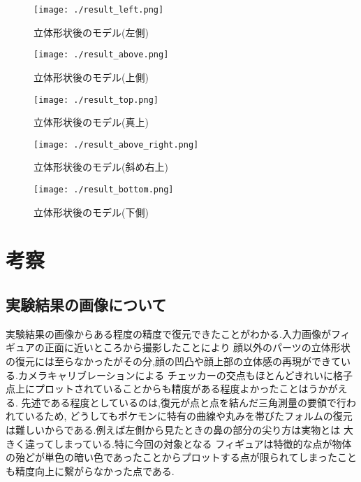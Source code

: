 \documentclass[11pt,a4j]{jsarticle}
\begin{document}
    \begin{figure}[H]
      \centering
      \texttt{[image: ./result\_left.png]}
      \caption{立体形状後のモデル(左側)\label{fig:result_left}}
    \end{figure}
    \begin{figure}[H]
      \centering
      \texttt{[image: ./result\_above.png]}
      \caption{立体形状後のモデル(上側)\label{fig:result_above}}
    \end{figure}
    \begin{figure}[H]
      \centering
      \texttt{[image: ./result\_top.png]}
      \caption{立体形状後のモデル(真上)\label{fig:result_top}}
    \end{figure}
    \begin{figure}[H]
      \centering
      \texttt{[image: ./result\_above\_right.png]}
      \caption{立体形状後のモデル(斜め右上)\label{fig:result_above_right}}
    \end{figure}
    \begin{figure}[H]
      \centering
      \texttt{[image: ./result\_bottom.png]}
      \caption{立体形状後のモデル(下側)\label{fig:result_bottom}}
    \end{figure}
    \section{考察}
    \subsection{実験結果の画像について}
    実験結果の画像からある程度の精度で復元できたことがわかる.入力画像がフィギュアの正面に近いところから撮影したことにより
    顔以外のパーツの立体形状の復元には至らなかったがその分,顔の凹凸や顔上部の立体感の再現ができている.カメラキャリブレーションによる
    チェッカーの交点もほとんどきれいに格子点上にプロットされていることからも精度がある程度よかったことはうかがえる.
    先述である程度としているのは,復元が点と点を結んだ三角測量の要領で行われているため,
    どうしてもポケモンに特有の曲線や丸みを帯びたフォルムの復元は難しいからである.例えば左側から見たときの鼻の部分の尖り方は実物とは
    大きく違ってしまっている.特に今回の対象となる
    フィギュアは特徴的な点が物体の殆どが単色の暗い色であったことからプロットする点が限られてしまったことも精度向上に繋がらなかった点である.
\end{document}
